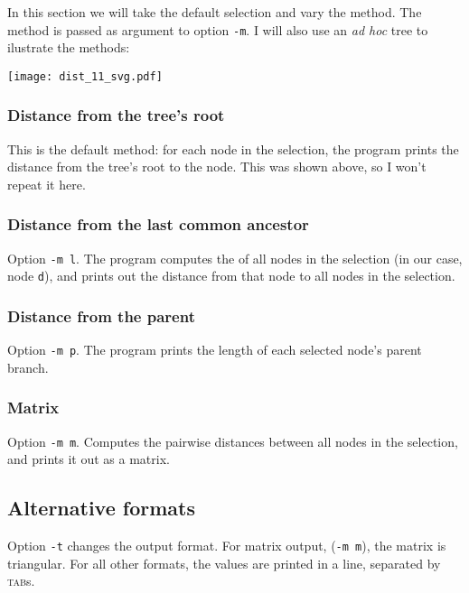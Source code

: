 In this section we will take the default selection and vary the method. The
method is passed as argument to option \texttt{-m}. I will also use an
\emph{ad hoc} tree to ilustrate the methods:

\texttt{[image: dist\_11\_svg.pdf]}

\subsubsection{Distance from the tree's root}

This is the default method: for each node in the selection, the program prints
the distance from the tree's root to the node. This was shown above, so I
won't repeat it here.

\subsubsection{Distance from the last common ancestor}
Option \texttt{-m l}. The program computes the \lca{} of all nodes in the
selection (in our case, node \texttt{d}), and prints out the distance from
that node to all nodes in the selection.



\subsubsection{Distance from the parent}
Option \texttt{-m p}. The program prints the length of each selected node's
parent branch.



\subsubsection{Matrix}
Option \texttt{-m m}. Computes the pairwise distances between all nodes in the
selection, and prints it out as a matrix.



\subsection{Alternative formats}

Option \texttt{-t} changes the output format. For matrix output, (\texttt{-m
m}), the matrix is triangular. For all other formats, the values are printed
in a line, separated by \textsc{tab}s.





